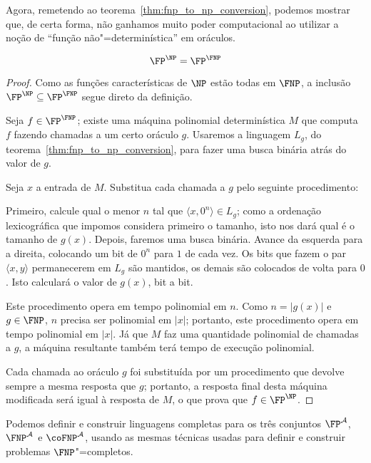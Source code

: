 Agora,
remetendo ao teorema~\ref{thm:fnp_to_np_conversion},
podemos mostrar que,
de certa forma,
não ganhamos muito poder computacional
ao utilizar a noção de ``função não"=determinística'' em oráculos.

\begin{theorem}
    \begin{equation*}
        \FP^\NP = \FP^\FNP
    \end{equation*}
    \label{thm:fp_np_equals_fp_fnp}
\end{theorem}

\begin{proof}
    Como as funções características de $\NP$ estão todas em $\FNP$,
    a inclusão $\FP^\NP \subseteq \FP^\FNP$ segue direto da definição.

    Seja $f \in \FP^\FNP$;
    existe uma máquina polinomial determinística $M$
    que computa $f$ fazendo chamadas a um certo oráculo $g$.
    Usaremos a linguagem $L_g$,
    do teorema~\ref{thm:fnp_to_np_conversion},
    para fazer uma busca binária atrás do valor de $g$.

    Seja $x$ a entrada de $M$.
    Substitua cada chamada a $g$
    pelo seguinte procedimento:

    Primeiro, calcule qual o menor $n$
    tal que $\langle x, 0^n \rangle \in L_g$;
    como a ordenação lexicográfica que impomos
    considera primeiro o tamanho,
    isto nos dará qual é o tamanho de $g(x)$.
    Depois,
    faremos uma busca binária.
    Avance da esquerda para a direita,
    colocando um bit de $0^n$ para $1$ de cada vez.
    Os bits que fazem o par $\langle x, y \rangle$
    permanecerem em $L_g$ são mantidos,
    os demais são colocados de volta para $0$.
    Isto calculará o valor de $g(x)$,
    bit a bit.

    Este procedimento opera em tempo polinomial em $n$.
    Como $n = |g(x)|$ e $g \in \FNP$,
    $n$ precisa ser polinomial em $|x|$;
    portanto, este procedimento opera em tempo polinomial em $|x|$.
    Já que $M$ faz uma quantidade polinomial de chamadas a $g$,
    a máquina resultante também terá tempo de execução polinomial.

    Cada chamada ao oráculo $g$ foi substituída por
    um procedimento que devolve sempre a mesma resposta que $g$;
    portanto, a resposta final desta máquina modificada
    será igual à resposta de $M$,
    o que prova que $f \in \FP^\NP$.
\end{proof}

Podemos definir e construir linguagens completas para os três conjuntos
$\FP^\mathcal A$, $\FNP^\mathcal A$ e $\coFNP^\mathcal A$,
usando as mesmas técnicas usadas para definir e construir problemas $\FNP$"=completos.

